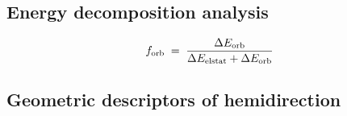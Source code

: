 \subsection{Energy decomposition analysis}
\label{sec:eda-method}
%
%
%
\begin{equation}
  f_{\mathrm{orb}} \;=\; \frac{\Delta E_{\mathrm{orb}}}
                   {\Delta E_{\mathrm{elstat}} + \Delta E_{\mathrm{orb}}}
  \label{eq:forb}
\end{equation}
%

\subsection{Geometric descriptors of hemidirection}
\label{sec:hemidirection-method}

